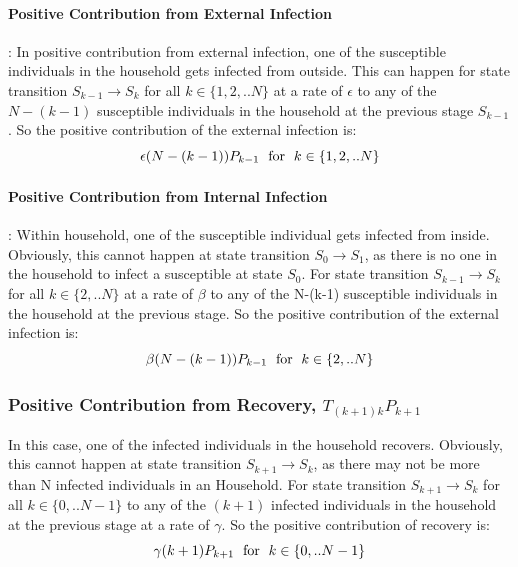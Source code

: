 \documentclass[paper=a4, fontsize=11pt, twoside, BCOR=12mm, parskip=full, listof=totoc]{scrreprt}
\begin{document}
\paragraph*{Positive Contribution from External Infection} :
\label{Positive Contribution From External Infection} 
In positive contribution from external infection, one of the susceptible individuals in the household gets infected from outside. This can happen for state transition $S_{k-1} \rightarrow S_k$ for all $k \in \{1,2,..N\}$ at a rate of $\epsilon$ to any of the $N-(k-1)$ susceptible individuals in the household at the previous stage $S_{k-1}$.
So the positive contribution of the external infection is:\\ 
	$$ \epsilon(N-(k-1))P_{k-1} \text{\hspace{3pt} for \hspace{3pt}} k \in \{1,2,..N\} $$ 
%
\paragraph*{Positive Contribution from  Internal Infection} :
\label{Positive Contribution From Internal Infection} 
Within household, one of the susceptible individual gets infected from inside. Obviously, this cannot happen at state transition $ S_0 \rightarrow S_1 $, as there is no one in the household to infect a susceptible at state $S_0$. For state transition $S_{k-1}\rightarrow S_k$ for all $k \in \{2,..N\} $ at a rate of $\beta$ to any of the N-(k-1) susceptible individuals in the household at the previous stage. 
So the positive contribution of the external infection is: \\
$$\beta(N-(k-1))P_{k-1} \text{\hspace{3pt} for \hspace{3pt}} k \in \{2,..N\} $$ 
%
\subsubsection*{Positive Contribution from Recovery, $T_{(k+1)k}P_{k+1}$}
\label{Positive Contribution from Recovery} 
In this case, one of the infected individuals in the household recovers. Obviously, this cannot happen at state transition  $ S_{k+1}\rightarrow S_k $, as there may not be more than N infected individuals in an Household. For state transition $S_{k+1}\rightarrow S_k$ for all $k \in \{0,..N-1\} $ to any of the $(k+1)$ infected individuals in the household at the previous stage at a rate of $\gamma$. So the positive contribution of recovery is: 
	$$\gamma (k+1)P_{k+1} \text{\hspace{3pt} for \hspace{3pt}} k \in \{0,..N-1\} $$
	
\end{document}
